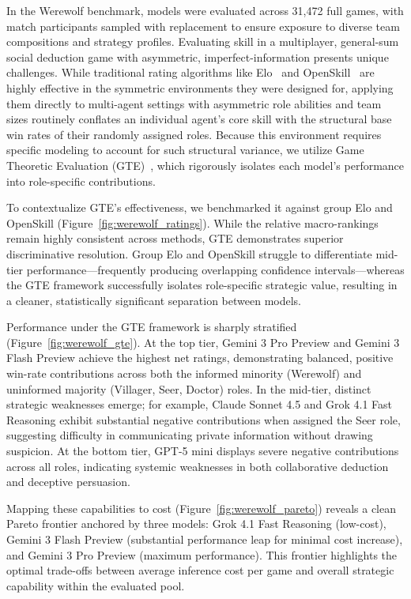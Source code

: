 \documentclass{article}
\begin{document}
In the Werewolf benchmark, models were evaluated across 31,472 full games, with match participants sampled with replacement to ensure exposure to diverse team compositions and strategy profiles. Evaluating skill in a multiplayer, general-sum social deduction game with asymmetric, imperfect-information presents unique challenges. While traditional rating algorithms like Elo~\citep{elo1978rating} and OpenSkill~\citep{herbrich2006trueskill, minka2018trueskill} are highly effective in the symmetric environments they were designed for, applying them directly to multi-agent settings with asymmetric role abilities and team sizes routinely conflates an individual agent's core skill with the structural base win rates of their randomly assigned roles. Because this environment requires specific modeling to account for such structural variance, we utilize Game Theoretic Evaluation (GTE)~\citep{liu2025re}, which rigorously isolates each model's performance into role-specific contributions.

To contextualize GTE's effectiveness, we benchmarked it against group Elo and OpenSkill (Figure~\ref{fig:werewolf_ratings}). While the relative macro-rankings remain highly consistent across methods, GTE demonstrates superior discriminative resolution. Group Elo and OpenSkill struggle to differentiate mid-tier performance---frequently producing overlapping confidence intervals---whereas the GTE framework successfully isolates role-specific strategic value, resulting in a cleaner, statistically significant separation between models.

Performance under the GTE framework is sharply stratified (Figure~\ref{fig:werewolf_gte}). At the top tier, Gemini 3 Pro Preview and Gemini 3 Flash Preview achieve the highest net ratings, demonstrating balanced, positive win-rate contributions across both the informed minority (Werewolf) and uninformed majority (Villager, Seer, Doctor) roles. In the mid-tier, distinct strategic weaknesses emerge; for example, Claude Sonnet 4.5 and Grok 4.1 Fast Reasoning exhibit substantial negative contributions when assigned the Seer role, suggesting difficulty in communicating private information without drawing suspicion. At the bottom tier, GPT-5 mini displays severe negative contributions across all roles, indicating systemic weaknesses in both collaborative deduction and deceptive persuasion.

Mapping these capabilities to cost (Figure~\ref{fig:werewolf_pareto}) reveals a clean Pareto frontier anchored by three models: Grok 4.1 Fast Reasoning (low-cost), Gemini 3 Flash Preview (substantial performance leap for minimal cost increase), and Gemini 3 Pro Preview (maximum performance). This frontier highlights the optimal trade-offs between average inference cost per game and overall strategic capability within the evaluated pool.
\end{document}
